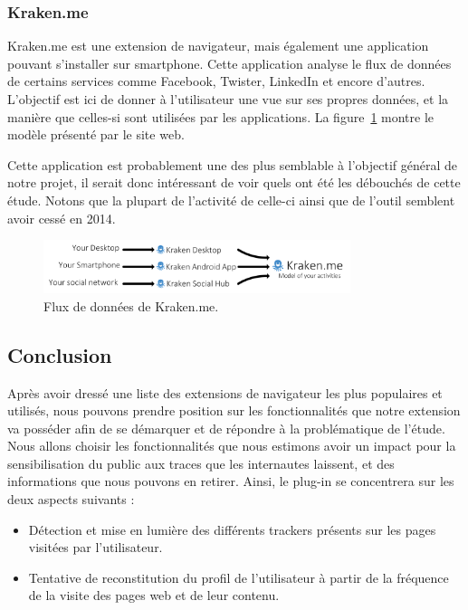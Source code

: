 		\subsubsection{Kraken.me}

			Kraken.me est une extension de navigateur, mais également une application pouvant s'installer sur smartphone. Cette application analyse le flux de données de certains services comme Facebook, Twister, LinkedIn et encore d'autres. L'objectif est ici de donner à l'utilisateur une vue sur ses propres données, et la manière que celles-si sont utilisées par les applications.
			La figure~\ref{a-krakenme} montre le modèle présenté par le site web.

			Cette application est probablement une des plus semblable à l'objectif général de notre projet, il serait donc intéressant de voir quels ont été les débouchés de cette étude. Notons que la plupart de l'activité de celle-ci ainsi que de l'outil semblent avoir cessé en 2014.

			\begin{figure}[h]
				\centering
				\includegraphics[width=0.8\textwidth]{images/analysis/krakenme}
				\caption{Flux de données de Kraken.me\cite{krakenme}.}
				\label{a-krakenme}
			\end{figure}

	\subsection{Conclusion}

		Après avoir dressé une liste des extensions de navigateur les plus populaires et utilisés, nous pouvons prendre position sur les fonctionnalités que notre extension va posséder afin de se démarquer et de répondre à la problématique de l'étude. Nous allons choisir les fonctionnalités que nous estimons avoir un impact pour la sensibilisation du public aux traces que les internautes laissent, et des informations que nous pouvons en retirer. Ainsi, le plug-in se concentrera sur les deux aspects suivants :

		\begin{itemize}
			\item Détection et mise en lumière des différents trackers présents sur les pages visitées par l'utilisateur.
			\item Tentative de reconstitution du profil de l'utilisateur à partir de la fréquence de la visite des pages web et de leur contenu.
		\end{itemize}

